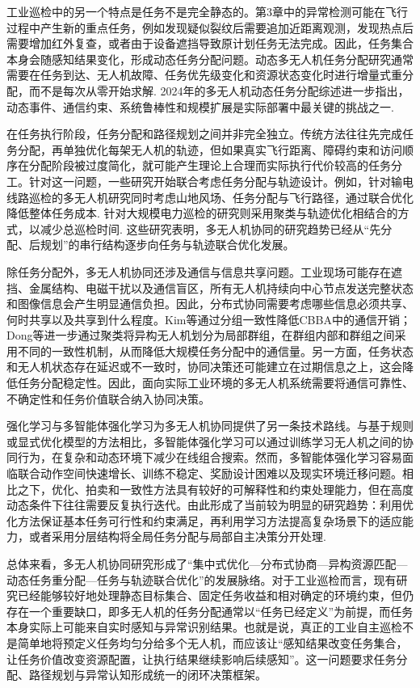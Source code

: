工业巡检中的另一个特点是任务不是完全静态的。第3章中的异常检测可能在飞行过程中产生新的重点任务，例如发现疑似裂纹后需要追加近距离观测，发现热点后需要增加红外复查，或者由于设备遮挡导致原计划任务无法完成。因此，任务集合本身会随感知结果变化，形成动态任务分配问题。动态多无人机任务分配研究通常需要在任务到达、无人机故障、任务优先级变化和资源状态变化时进行增量式重分配，而不是每次从零开始求解\cite{Skaltsis2023,Mahto2023}. 2024年的多无人机动态任务分配综述进一步指出，动态事件、通信约束、系统鲁棒性和规模扩展是实际部署中最关键的挑战之一\cite{Alqefari2025}.

在任务执行阶段，任务分配和路径规划之间并非完全独立。传统方法往往先完成任务分配，再单独优化每架无人机的轨迹，但如果真实飞行距离、障碍约束和访问顺序在分配阶段被过度简化，就可能产生理论上合理而实际执行代价较高的任务分工。针对这一问题，一些研究开始联合考虑任务分配与轨迹设计。例如，针对输电线路巡检的多无人机研究同时考虑山地风场、任务分配与飞行路径，通过联合优化降低整体任务成本\cite{Li2024Wind}. 针对大规模电力巡检的研究则采用聚类与轨迹优化相结合的方式，以减少总巡检时间\cite{Gao2024Power}. 这些研究表明，多无人机协同的研究趋势已经从“先分配、后规划”的串行结构逐步向任务与轨迹联合优化发展。

除任务分配外，多无人机协同还涉及通信与信息共享问题。工业现场可能存在遮挡、金属结构、电磁干扰以及通信盲区，所有无人机持续向中心节点发送完整状态和图像信息会产生明显通信负担。因此，分布式协同需要考虑哪些信息必须共享、何时共享以及共享到什么程度。Kim等\cite{Kim2020}通过分组一致性降低CBBA中的通信开销；Dong等\cite{Dong2025}进一步通过聚类将异构无人机划分为局部群组，在群组内部和群组之间采用不同的一致性机制，从而降低大规模任务分配中的通信量。另一方面，任务状态和无人机状态存在延迟或不一致时，协同决策还可能建立在过期信息之上，这会降低任务分配稳定性。因此，面向实际工业环境的多无人机系统需要将通信可靠性、不确定性和任务价值联合纳入协同决策。

强化学习与多智能体强化学习为多无人机协同提供了另一条技术路线。与基于规则或显式优化模型的方法相比，多智能体强化学习可以通过训练学习无人机之间的协同行为，在复杂和动态环境下减少在线组合搜索。然而，多智能体强化学习容易面临联合动作空间快速增长、训练不稳定、奖励设计困难以及现实环境迁移问题。相比之下，优化、拍卖和一致性方法具有较好的可解释性和约束处理能力，但在高度动态条件下往往需要反复执行迭代。由此形成了当前较为明显的研究趋势：利用优化方法保证基本任务可行性和约束满足，再利用学习方法提高复杂场景下的适应能力，或者采用分层结构将全局任务分配与局部自主决策分开处理\cite{Chakraa2023,Pan2024,Dong2025}.

总体来看，多无人机协同研究形成了“集中式优化—分布式协商—异构资源匹配—动态任务重分配—任务与轨迹联合优化”的发展脉络。对于工业巡检而言，现有研究已经能够较好地处理静态目标集合、固定任务收益和相对确定的环境约束，但仍存在一个重要缺口，即多无人机的任务分配通常以“任务已经定义”为前提，而任务本身实际上可能来自实时感知与异常识别结果。也就是说，真正的工业自主巡检不是简单地将预定义任务均匀分给多个无人机，而应该让“感知结果改变任务集合，让任务价值改变资源配置，让执行结果继续影响后续感知”。这一问题要求任务分配、路径规划与异常认知形成统一的闭环决策框架。

